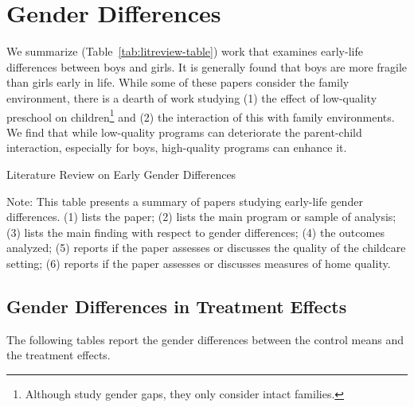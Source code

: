 \section{Gender Differences}
\label{appendix:genderdifferences}

We summarize (Table~\ref{tab:litreview-table}) work that examines early-life differences between boys and girls. It is generally found that boys are more fragile than girls early in life. While some of these papers consider the family environment, there is a dearth of work studying (1) the effect of low-quality preschool on children\footnote{Although \citet{Kottelenberg-Lehrer_2014_Gender-Effects} study gender gaps, they only consider intact families.} and (2) the interaction of this with family environments. We find that while low-quality programs can deteriorate the parent-child interaction, especially for boys, high-quality programs can enhance it.

\begin{sidewaystable}[H]
\centering
\caption{Literature Review on Early Gender Differences}
\label{tab:litreview-table}
\begin{adjustbox}{width=1.05\textwidth}
\begin{threeparttable}

\begin{tablenotes}
\Large
\item Note: This table presents a summary of papers studying early-life gender differences. (1) lists the paper; (2) lists the main program or sample of analysis; (3) lists the main finding with respect to gender differences; (4) the outcomes analyzed; (5) reports if the paper assesses or discusses the quality of the childcare setting; (6) reports if the paper assesses or discusses measures of home quality.
\end{tablenotes}
\end{threeparttable}
\end{adjustbox}
\end{sidewaystable} 

\subsection{Gender Differences in Treatment Effects}
\label{appendix:gdiff-tes}
The following tables report the gender differences between the control means and the treatment effects.

